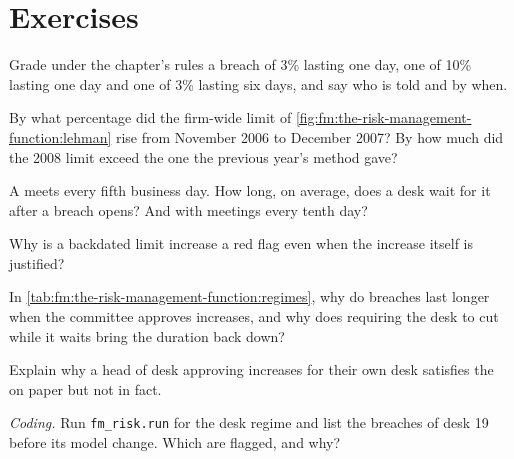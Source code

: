 \section{Exercises}

\begin{exercise}[$\star$]\label{exo:fm:the-risk-management-function:1}
Grade under the chapter's rules a breach of 3\% lasting one day, one of 10\% lasting one day and one of 3\% lasting six days, and say who is told and
by when.
\end{exercise}

\begin{exercise}[$\star$]\label{exo:fm:the-risk-management-function:2}
By what percentage did the firm-wide limit of \cref{fig:fm:the-risk-management-function:lehman} rise from November 2006 to December 2007? By how much
did the 2008 limit exceed the one the previous year's method gave?
\end{exercise}

\begin{exercise}[$\star$]\label{exo:fm:the-risk-management-function:3}
A  meets every fifth business day. How long, on average, does a desk wait for it after a breach opens? And with meetings every
tenth day?
\end{exercise}

\begin{exercise}[$\star\star$]\label{exo:fm:the-risk-management-function:4}
Why is a backdated limit increase a red flag even when the increase itself is justified?
\end{exercise}

\begin{exercise}[$\star\star$]\label{exo:fm:the-risk-management-function:5}
In \cref{tab:fm:the-risk-management-function:regimes}, why do breaches last longer when the committee approves increases, and why does requiring the
desk to cut while it waits bring the duration back down?
\end{exercise}

\begin{exercise}[$\star\star$]\label{exo:fm:the-risk-management-function:6}
Explain why a head of desk approving increases for their own desk satisfies the  on paper but not in fact.
\end{exercise}

\begin{exercise}[$\star\star\star$]\label{exo:fm:the-risk-management-function:7}
\emph{Coding.} Run \texttt{fm\_risk.run} for the desk regime and list the breaches of desk 19 before its model change. Which are flagged, and why?
\end{exercise}

